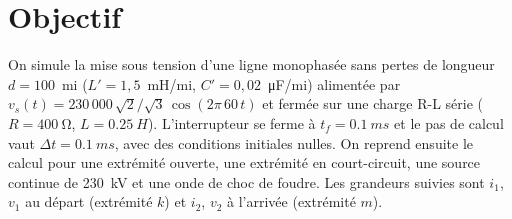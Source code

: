 \section{Objectif}

On simule la mise sous tension d'une ligne monophasée sans pertes de longueur
$d = 100$~mi ($L' = 1{,}5$~mH/mi, $C' = 0{,}02$~\unit{\micro\farad}/mi) alimentée par
$v_s(t) = 230\,000\,\sqrt{2}/\sqrt{3}\,\cos(2\pi\,60\,t)$ et fermée sur une charge R-L série
($R = \SI{400}{\ohm}$, $L = \SI{0.25}{H}$). L'interrupteur se ferme à $t_f = \SI{0.1}{ms}$ et
le pas de calcul vaut $\Delta t = \SI{0.1}{ms}$, avec des conditions initiales nulles.
On reprend ensuite le calcul pour une extrémité ouverte, une extrémité en court-circuit, une
source continue de 230~kV et une onde de choc de foudre. Les grandeurs suivies sont $i_1$, $v_1$
au départ (extrémité $k$) et $i_2$, $v_2$ à l'arrivée (extrémité $m$).

